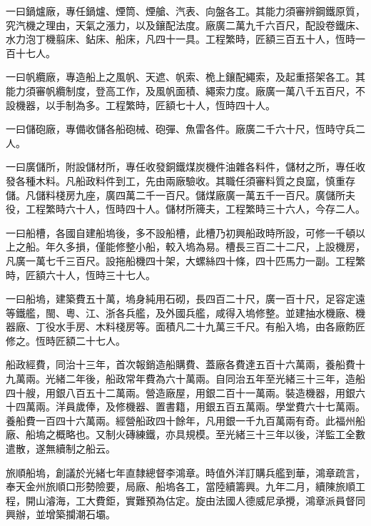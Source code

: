 \begin{pinyinscope}
一曰鍋爐廠，專任鍋爐、煙筒、煙艙、汽表、向盤各工。其能力須審辨鋼鐵原質，究汽機之理由，天氣之漲力，以及鑲配法度。廠廣二萬九千六百尺，配設卷鐵床、水力泡丁機翦床、鉆床、船床，凡四十一具。工程繁時，匠額三百五十人，恆時一百十七人。

一曰帆纜廠，專造船上之風帆、天遮、帆索、桅上鑲配繩索，及起重搭架各工。其能力須審帆纜制度，登高工作，及風帆面積、繩索力度。廠廣一萬八千五百尺，不設機器，以手制為多。工程繁時，匠額七十人，恆時四十人。

一曰儲砲廠，專備收儲各船砲械、砲彈、魚雷各件。廠廣二千六十尺，恆時守兵二人。

一曰廣儲所，附設儲材所，專任收發銅鐵煤炭機件油雜各料件，儲材之所，專任收發各種木料。凡船政料件到工，先由兩廠驗收。其職任須審料質之良窳，慎重存儲。凡儲料棧房九座，廣四萬二千一百尺。儲煤廠廣一萬五千一百尺。廣儲所夫役，工程繁時六十人，恆時四十人。儲材所簰夫，工程繁時三十六人，今存二人。

一曰船槽，各國自建船塢後，多不設船槽，此槽乃初興船政時所設，可修一千頓以上之船。年久多損，僅能修整小船，較入塢為易。槽長三百二十二尺，上設機房，凡廣一萬七千三百尺。設拖船機四十架，大螺絲四十條，四十匹馬力一副。工程繁時，匠額六十人，恆時三十七人。

一曰船塢，建築費五十萬，塢身純用石砌，長四百二十尺，廣一百十尺，足容定遠等鐵艦，閩、粵、江、浙各兵艦，及外國兵艦，咸得入塢修整。並建抽水機廠、機器廠、丁役水手房、木料棧房等。面積凡二十九萬三千尺。有船入塢，由各廠飭匠修之。恆時匠額二十七人。

船政經費，同治十三年，首次報銷造船購費、蓋廠各費達五百十六萬兩，養船費十九萬兩。光緒二年後，船政常年費為六十萬兩。自同治五年至光緒三十三年，造船四十艘，用銀八百五十二萬兩。營造廠屋，用銀二百十一萬兩。裝造機器，用銀六十四萬兩。洋員歲俸，及修機器、置書籍，用銀五百五萬兩。學堂費六十七萬兩。養船費一百四十六萬兩。經營船政四十餘年，凡用銀一千九百萬兩有奇。此福州船廠、船塢之概略也。又制火磚練鐵，亦具規模。至光緒三十三年以後，洋監工全數遣散，遂無續制之船云。

旅順船塢，創議於光緒七年直隸總督李鴻章。時值外洋訂購兵艦到華，鴻章疏言，奉天金州旅順口形勢險要，局廠、船塢各工，當陸續籌興。九年二月，續陳旅順工程，開山濬海，工大費鉅，實難預為估定。旋由法國人德威尼承攪，鴻章派員督同興辦，並增築攔潮石壩。


\end{pinyinscope}
